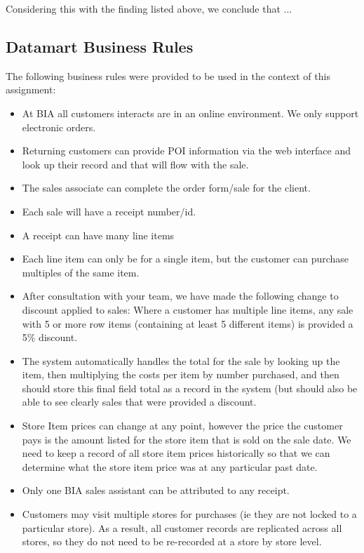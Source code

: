 \documentclass{article}
\begin{document}
	 
	 Considering this with the finding listed above, we conclude that ...
    
	
\newpage



    \subsection{Datamart Business Rules}
    The following business rules were provided to be used in the context of this assignment:
    \begin{itemize}
        \item At BIA all customers interacts are in an online environment. We only support electronic orders.
        \item Returning customers can provide POI information via the web interface and look up their record and that will flow with the sale.
        \item The sales associate can complete the order form/sale for the client.
        \item Each sale will have a receipt number/id.
        \item A receipt can have many line items 
        \item Each line item can only be for a single item, but the customer can purchase multiples of the same item.
        \item After consultation with your team, we have made the following change to discount applied to sales: 
        Where a customer has multiple line items, any sale with 5 or more row items (containing at least 5 different items) 
        is provided a 5\% discount.
        \item The system automatically handles the total for the sale by looking up the item, then multiplying the costs 
        per item by number purchased, and then should store this final field total as a record in the system (but should
        also be able to see clearly sales that were provided a discount. 
        \item Store Item prices can change at any point, however the price the customer pays is the amount listed for the
        store item that is sold on the sale date. We need to keep a record of all store item prices historically so that 
        we can determine what the store item price was at any particular past date.
        \item Only one BIA sales assistant can be attributed to any receipt.
        \item Customers may visit multiple stores for purchases (ie they are not locked to a particular store). As a 
        result, all customer records are replicated across all stores, so they do not need to be re-recorded at a 
        store by store level.
    \end{itemize}
   
\end{document}
